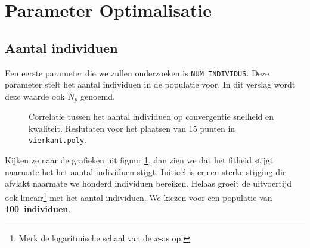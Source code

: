 %
\section{Parameter Optimalisatie}
\subsection{Aantal individuen}
Een eerste parameter die we zullen onderzoeken is \texttt{NUM\_INDIVIDUS}. Deze parameter stelt het aantal individuen in de populatie voor. In dit verslag wordt deze waarde ook $N_p$ genoemd.
\begin{figure}[H]



  \caption{Correlatie tussen het aantal individuen op convergentie snelheid en kwaliteit. Reslutaten voor het plaatsen van 15 punten in \texttt{vierkant.poly}.}
  \label{graf:numIndividus}
\end{figure}
Kijken ze naar de grafieken uit figuur \ref{graf:numIndividus}, dan zien we dat het fitheid stijgt naarmate het het aantal individuen stijgt. Initieel is er een sterke stijging die afvlakt naarmate we honderd individuen bereiken. Helaas groeit de uitvoertijd ook lineair\footnote{Merk de logaritmische schaal van de $x$-as op.} met het aantal individuen. We kiezen voor een populatie van \textbf{100~individuen}. 
%
%
%
%
%
